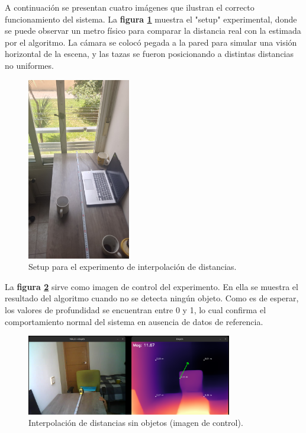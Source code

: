 A continuación se presentan cuatro imágenes que ilustran el correcto funcionamiento del sistema. La \textbf{figura \ref{fig:setup_inter}} muestra el "setup" experimental, donde se puede observar un metro físico para comparar la distancia real con la estimada por el algoritmo. La cámara se colocó pegada a la pared para simular una visión horizontal de la escena, y las tazas se fueron posicionando a distintas distancias no uniformes.

\begin{figure}[H]
\centering
\includegraphics[width=0.4\textwidth,angle=90]{images/setup_inter.jpeg}
\caption{Setup para el experimento de interpolación de distancias.}
\label{fig:setup_inter}
\end{figure}

La \textbf{figura \ref{fig:0obj_inter}} sirve como imagen de control del experimento. En ella se muestra el resultado del algoritmo cuando no se detecta ningún objeto. Como es de esperar, los valores de profundidad se encuentran entre 0 y 1, lo cual confirma el comportamiento normal del sistema en ausencia de datos de referencia.

\begin{figure}[H]
\centering
\includegraphics[width=0.8\textwidth]{images/0objetos_interpolacion.png}
\caption{Interpolación de distancias sin objetos (imagen de control).}
\label{fig:0obj_inter}
\end{figure}

